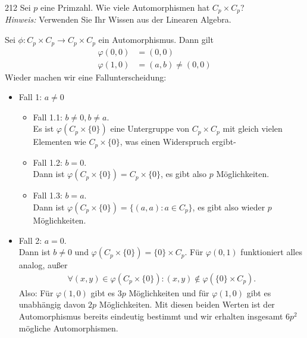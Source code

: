 \begin{algebraUE}{212}
  Sei $p$ eine Primzahl. Wie viele Automorphismen hat $C_p \times C_p$? \\
  \textit{Hinweis:} Verwenden Sie Ihr Wissen aus der Linearen Algebra.
\end{algebraUE}
\begin{solution}
  Sei $\phi: C_p \times C_p \rightarrow C_p \times C_p$ ein Automorphismus.
  Dann gilt
  \begin{align*}
    \varphi(0,0) &= (0,0) \\
    \varphi(1,0) &= (a,b) \neq (0,0)
  \end{align*}
  Wieder machen wir eine Fallunterscheidung:
  \begin{itemize}
    \item Fall 1: $a \neq 0$
    \begin{itemize}
      \item Fall 1.1: $b \neq 0, b \neq a$. \\
      Es ist $\varphi(C_p \times \{0\})$ eine Untergruppe von $C_p \times C_p$
      mit gleich vielen Elementen wie $C_p \times \{0\}$, was einen Widerspruch ergibt-
      \item Fall 1.2: $b = 0$. \\
      Dann ist $\varphi(C_p \times \{0\}) = C_p \times \{0\}$, es gibt also $p$ Möglichkeiten.
      \item Fall 1.3: $b = a$. \\
      Dann ist $\varphi(C_p \times \{0\}) = \{(a,a): a \in C_p\}$, es gibt also wieder
      $p$ Möglichkeiten.
    \end{itemize}
    \item Fall 2: $a = 0$. \\
    Dann ist $b \neq 0$ und $\varphi(C_p \times \{0\}) = \{0\} \times C_p$.
    Für $\varphi(0,1)$ funktioniert alles analog, außer
    \begin{align*}
      \forall (x,y) \in \varphi(C_p \times \{0\}): (x,y) \notin \varphi(\{0\} \times C_p).
    \end{align*}
    Also: Für $\varphi(1,0)$ gibt es $3p$ Möglichkeiten und für $\varphi(1,0)$
    gibt es unabhängig davon $2p$ Möglichkeiten. Mit diesen beiden Werten ist
    der Automorphismus bereits eindeutig bestimmt und wir erhalten insgesamt
    $6p^2$ mögliche Automorphismen.
  \end{itemize}
\end{solution}

